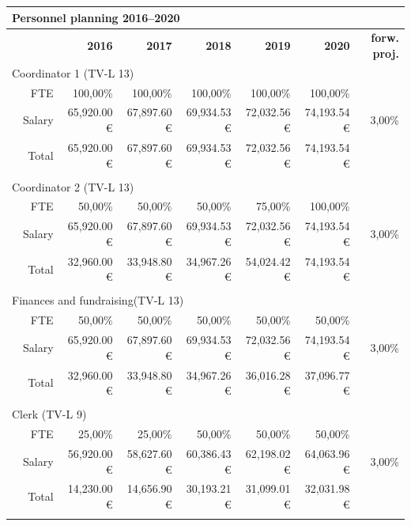\documentclass[nonflat,smallfont
]{langsci/langscibook}
\begin{document}
{{\begin{tabular}{lrrrrrrr}
\multicolumn{5}{l}{ \textbf{Personnel planning 2016--2020}}\\
\midrule
& & \textbf{2016} & \textbf{2017} & \textbf{2018} & \textbf{2019} & \textbf{2020} & \textbf{forw. proj.}\\
\midrule 
\multicolumn{5}{l}{ Coordinator 1 (TV-L 13)}\\
\midrule
&  FTE &  100,00\% &  100,00\% &  100,00\% &  100,00\% &  100,00\% & ~\\
&  Salary &  65,920.00 € &  67,897.60 € &  69,934.53 € &  72,032.56 € &  74,193.54 € &  3,00\%\\
 &  Total &  65,920.00 € &  67,897.60 € &  69,934.53 € &  72,032.56 € &  74,193.54 € & ~\\
\\
\multicolumn{5}{l}{ Coordinator 2 (TV-L 13)}\\
\midrule
&  FTE &  50,00\% &  50,00\% &  50,00\% &  75,00\% &  100,00\% & ~\\
&  Salary &  65,920.00 € &  67,897.60 € &  69,934.53 € &  72,032.56 € &  74,193.54 € &  3,00\%\\
 &  Total &  32,960.00 € &  33,948.80 € &  34,967.26 € &  54,024.42 € &  74,193.54 € & ~\\
\\
\multicolumn{5}{l}{ Finances and fundraising(TV-L 13)}\\
\midrule
&  FTE &  50,00\% &  50,00\% &  50,00\% &  50,00\% &  50,00\% & ~\\
&  Salary &  65,920.00 € &  67,897.60 € &  69,934.53 € &  72,032.56 € &  74,193.54 € &  3,00\%\\
 &  Total &  32,960.00 € &  33,948.80 € &  34,967.26 € &  36,016.28 € &  37,096.77 € & ~\\
\\
\multicolumn{5}{l}{ Clerk (TV-L 9)}\\
\midrule
&  FTE &  25,00\% &  25,00\% &  50,00\% &  50,00\% &  50,00\% & ~\\
&  Salary &  56,920.00 € &  58,627.60 € &  60,386.43 € &  62,198.02 € &  64,063.96 € &  3,00\%\\
 &  Total &  14,230.00 € &  14,656.90 € &  30,193.21 € &  31,099.01 € &  32,031.98 € & ~\\
\\
\end{tabular}
}
\noindent
{}}
\end{document}
